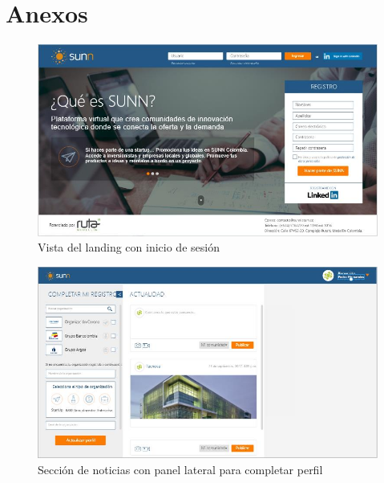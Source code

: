 \chapter*{Anexos}
\appendix

\begin{figure}[ht]
	\includegraphics[scale=0.6, center]{images/mockup1.jpg}
	\caption{Vista del landing con inicio de sesión}
	\label{fig:img4}
\end{figure}

\begin{figure}[ht]
	\includegraphics[scale=0.6, center]{images/mockup2.jpg}
	\caption{Sección de noticias con panel lateral para completar perfil}
	\label{fig:img5}
\end{figure}


